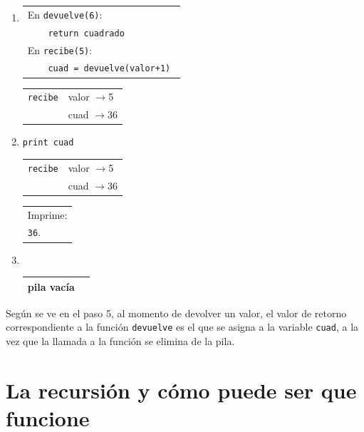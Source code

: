 \begin{enumerate}
\item
\begin{tabular}{l}
En \lstinline!devuelve(6)!: \\ \verb|    return cuadrado| \\
En \lstinline!recibe(5)!:   \\ \verb|    cuad = devuelve(valor+1) |
\end{tabular}
	\begin{tabular}{r|l|}
	\hline
	\verb|recibe|&valor $\rightarrow$5\\
	             &cuad  $\rightarrow$36\\
	\hline
	\end{tabular}

\item  \verb!print cuad              ! \hspace{1.5cm}
	\begin{tabular}{r|l|}
	\hline
	\verb|recibe|&valor $\rightarrow$5\\
	             &cuad  $\rightarrow$36\\
	\hline
	\end{tabular}
	\begin{tabular}{l}
	Imprime:\\
	\verb|36|.
	\end{tabular}

\item  \verb|                        | \hspace{1.5cm}
	\begin{tabular}{r|l|}
	\hline
	pila vacía\\
	\hline
	\end{tabular}

\end{enumerate}

Según se ve en el paso 5, al momento de devolver un valor, el valor de
retorno correspondiente a la función \lstinline!devuelve! es el que se
asigna a la variable \lstinline!cuad!, a la vez que la llamada a la función
se elimina de la pila.

\section{La recursión y cómo puede ser que funcione}



